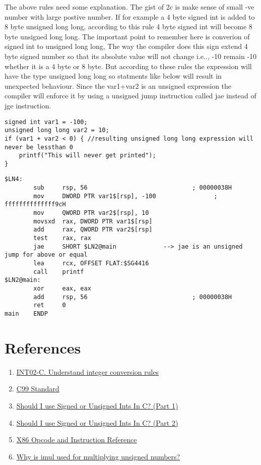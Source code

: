 \documentclass{article}
\begin{document}
The above rules need some explanation. The gist of 2c is make sense of small -ve
number with large postive number. If for example a 4 byte signed int is added
to 8 byte unsigned long long, according to this rule 4 byte signed int will
become 8 byte unsigned long long. The important point to remember here is
converion of signed int to unsigned long long, The way the compiler does this
sign extend 4 byte signed number so that its absolute value will not change
i.e.., -10 remain -10 whether it is a 4 byte or 8 byte. But according to these
rules the expression will have the type unsigned long long so statments like
below will result in unexpected behaviour. Since the var1+var2 is an unsigned
expression the compiler will enforce it by using a unsigned jump instruction
called jae instead of jge instruction.






\begin{verbatim}
signed int var1 = -100;
unsigned long long var2 = 10;
if (var1 + var2 < 0) { //resulting unsigned long long expression will never be lessthan 0
    printf("This will never get printed");
}
\end{verbatim}
\begin{verbatim}
$LN4:
        sub     rsp, 56                             ; 00000038H
        mov     DWORD PTR var1$[rsp], -100                ; ffffffffffffff9cH
        mov     QWORD PTR var2$[rsp], 10
        movsxd  rax, DWORD PTR var1$[rsp]
        add     rax, QWORD PTR var2$[rsp]
        test    rax, rax
        jae     SHORT $LN2@main             --> jae is an unsigned jump for above or equal
        lea     rcx, OFFSET FLAT:$SG4416
        call    printf
$LN2@main:
        xor     eax, eax
        add     rsp, 56                             ; 00000038H
        ret     0
main    ENDP
\end{verbatim}



\section{References}
\begin{enumerate}[noitemsep]
\item \href{https://wiki.sei.cmu.edu/confluence/display/c/INT02-C.+Understand+integer+conversion+rules}{INT02-C. Understand integer conversion rules}
\item \href{http://www.open-std.org/jtc1/sc22/wg14/www/docs/n1256.pdf}{C99 Standard}
\item \href{http://blog.robertelder.org/signed-or-unsigned/}{Should I use Signed or Unsigned Ints In C? (Part 1)}
\item \href{http://blog.robertelder.org/signed-or-unsigned-part-2/}{Should I use Signed or Unsigned Ints In C? (Part 2)}
\item \href{http://ref.x86asm.net/coder-abc.html}{X86 Opcode and Instruction Reference}
\item \href{https://stackoverflow.com/a/42589535/2407966}{Why is imul used for multiplying unsigned numbers?}

\end{enumerate}
\end{document}
